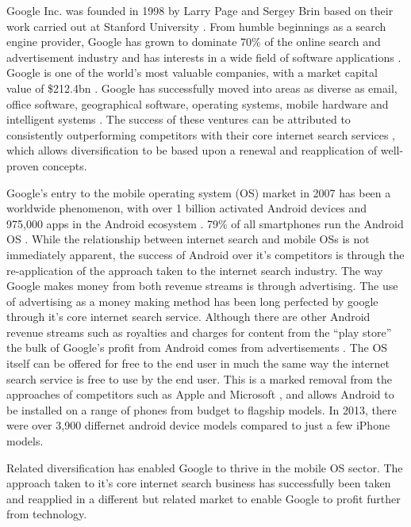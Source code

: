 
Google Inc. was founded in 1998 \cite{google:timeline} by Larry Page and Sergey Brin based on their work carried out at Stanford University \cite{brin1998anatomy}. From humble beginnings as a search engine provider, Google has grown to dominate 70\% of the online search and advertisement industry \cite{rothrmel2013strategic} and has interests in a wide field of software applications \cite{wheelen2012strategic}. Google is one of the world's most valuable companies, with a market capital value of \$212.4bn \cite{FT500}. Google has successfully moved into areas as diverse as email, office software, geographical software, operating systems, mobile hardware and intelligent systems \cite{rothrmel2013strategic, wheelen2012strategic}. The success of these ventures can be attributed to consistently outperforming competitors with their core internet search services \cite{wheelen2012strategic}, which allows diversification to be based upon a renewal and reapplication of well-proven concepts.

Google's entry to the mobile operating system (OS) market in 2007 has been a worldwide phenomenon, with over 1 billion activated Android devices and 975,000 apps in the Android ecosystem \cite{google:timeline}. 79\% of all smartphones run the Android OS \cite{krajci2013android}. While the relationship between internet search and mobile OSs is not immediately apparent, the success of Android over it's competitors is through the re-application of the approach taken to the internet search industry. The way Google makes money from both revenue streams is through advertising. The use of advertising as a money making method has been long perfected by google through it's core internet search service. Although there are other Android revenue streams such as royalties and charges for content from the ``play store'' the bulk of Google's profit from Android comes from advertisements \cite{krajci2013android}. The OS itself can be offered for free to the end user in much the same way the internet search service is free to use by the end user. This is a marked removal from the approaches of competitors such as Apple and Microsoft \cite{rothrmel2013strategic}, and allows Android to be installed on a range of phones from budget to flagship models. In 2013, there were over 3,900 differnet android device models \cite{krajci2013android} compared to just a few iPhone models.

Related diversification has enabled Google to thrive in the mobile OS sector. The approach taken to it's core internet search business has successfully been taken and reapplied in a different but related market to enable Google to profit further from technology.

